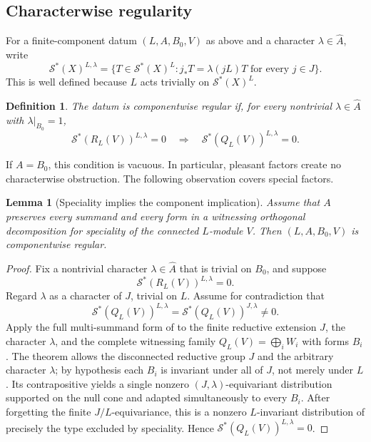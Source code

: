 \documentclass[10pt,a4paper]{amsart}
\numberwithin{equation}{section}
\newtheorem{lemma}[theorem]{Lemma}
\newtheorem{definition}[theorem]{Definition}
\newcommand{\cS}{\mathcal S}
\begin{document}
\subsection{Characterwise regularity}

For a finite-component datum $(L,A,B_0,V)$ as above and a character
$\lambda\in\widehat A$, write
\[
 \cS^*(X)^{L,\lambda}
 =\{T\in\cS^*(X)^L:j_*T=\lambda(jL)T\text{ for every }j\in J\}.
\]
This is well defined because $L$ acts trivially on $\cS^*(X)^L$.

\begin{definition}\label{def:componentwise-regular}
The datum is \emph{componentwise regular} if, for every nontrivial
$\lambda\in\widehat A$ with $\lambda|_{B_0}=1$,
\begin{equation}\label{eq:component-implication}
 \cS^*(R_L(V))^{L,\lambda}=0
 \quad\Longrightarrow\quad
 \cS^*(Q_L(V))^{L,\lambda}=0.
\end{equation}
\end{definition}

If $A=B_0$, this condition is vacuous.  In particular, pleasant factors create
no characterwise obstruction.  The following observation covers special
factors.

\begin{lemma}[Speciality implies the component implication]
\label{lem:special-component}
Assume that $A$ preserves every summand and every form in a witnessing
orthogonal decomposition for speciality of the connected $L$-module $V$.  Then
$(L,A,B_0,V)$ is componentwise regular.
\end{lemma}

\begin{proof}
Fix a nontrivial character $\lambda\in\widehat A$ that is trivial on $B_0$,
and suppose
\[
 \cS^*(R_L(V))^{L,\lambda}=0.
\]
Regard $\lambda$ as a character of $J$, trivial on $L$.  Assume for
contradiction that
\[
 \cS^*(Q_L(V))^{L,\lambda}
 =\cS^*(Q_L(V))^{J,\lambda}\ne0.
\]
Apply the full multi-summand form of
\cite[Theorem~5.2.2]{AG09} to the finite reductive extension $J$, the
character $\lambda$, and the complete witnessing family
$Q_L(V)=\bigoplus_iW_i$ with forms $B_i$.  The theorem allows the disconnected
reductive group $J$ and the arbitrary character $\lambda$; by hypothesis each
$B_i$ is invariant under all of $J$, not merely under $L$.  Its contrapositive
yields a single
nonzero $(J,\lambda)$-equivariant distribution supported on the null cone and
adapted simultaneously to every $B_i$.  After forgetting the finite
$J/L$-equivariance, this is a nonzero $L$-invariant distribution of precisely
the type excluded by speciality.  Hence
$\cS^*(Q_L(V))^{L,\lambda}=0$.
\end{proof}
\end{document}
